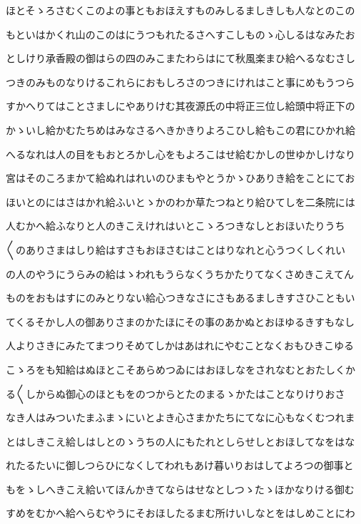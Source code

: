 \documentclass[a4paper,11pt,landscape]{ltjtarticle}
\begin{document}
ほとそゝろさむくこのよの事ともおほえすものみしるましきしも人なとのこの
\par\medskip
もといはかくれ山のこのはにうつもれたるさへすこしものゝ心しるはなみたお
\par\medskip
としけり承香殿の御はらの四のみこまたわらはにて秋風楽まひ給へるなむさし
\par\medskip
つきのみものなりけるこれらにおもしろさのつきにけれはこと事にめもうつら
\par\medskip
すかへりてはことさましにやありけむ其夜源氏の中将正三位し給頭中将正下の
\par\medskip
かゝいし給かむたちめはみなさるへきかきりよろこひし給もこの君にひかれ給
\par\medskip
へるなれは人の目をもおとろかし心をもよろこはせ給むかしの世ゆかしけなり
\par\medskip
宮はそのころまかて給ぬれはれいのひまもやとうかゝひありき給をことにてお
\par\medskip
ほいとのにはさはかれ給ふいとゝかのわか草たつねとり給ひてしを二条院には
\par\medskip
人むかへ給ふなりと人のきこえけれはいとこゝろつきなしとおほいたりうち
\par\medskip
〱のありさまはしり給はすさもおほさむはことはりなれと心うつくしくれい
\par\medskip
の人のやうにうらみの給はゝわれもうらなくうちかたりてなくさめきこえてん
\par\medskip
ものをおもはすにのみとりない給心つきなさにさもあるましきすさひこともい
\par\medskip
てくるそかし人の御ありさまのかたほにその事のあかぬとおほゆるきすもなし
\par\medskip
人よりさきにみたてまつりそめてしかはあはれにやむことなくおもひきこゆる
\par\medskip
こゝろをも知給はぬほとこそあらめつゐにはおほしなをされなむとおたしくか
\par\medskip
る〱しからぬ御心のほともをのつからとたのまるゝかたはことなりけりおさ
\par\medskip
なき人はみついたまふまゝにいとよき心さまかたちにてなに心もなくむつれま
\par\medskip
とはしきこえ給しはしとのゝうちの人にもたれとしらせしとおほしてなをはな
\par\medskip
れたるたいに御しつらひになくしてわれもあけ暮いりおはしてよろつの御事と
\par\medskip
もをゝしへきこえ給いてほんかきてならはせなとしつゝたゝほかなりける御む
\par\medskip
すめをむかへ給へらむやうにそおほしたるまむ所けいしなとをはしめことにわ
\end{document}

